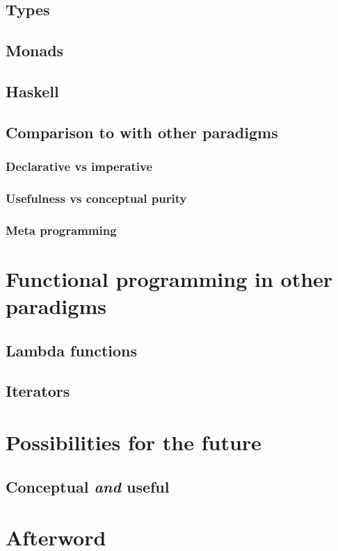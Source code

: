 \documentclass[11pt]{book}
\begin{document}
\section{Types}

\section{Monads}

\section{Haskell}

\section{Comparison to with other paradigms}

\subsection{Declarative vs imperative}

\subsection{Usefulness vs conceptual purity}

\subsection{Meta programming}

\chapter{Functional programming in other paradigms}

\section{Lambda functions}

\section{Iterators}

\chapter{Possibilities for the future}

\section{Conceptual \emph{and} useful}

\chapter*{Afterword}

\newpage
\printbibliography[heading=bibintoc, title={References}]
\end{document}

